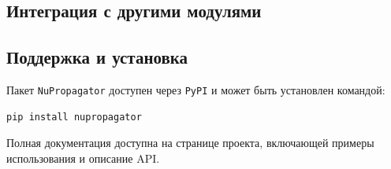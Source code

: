 \subsection{Интеграция с другими модулями}

\subsection{Поддержка и установка}

Пакет \texttt{NuPropagator} доступен через \texttt{PyPI} и может быть установлен командой:
\begin{verbatim}
pip install nupropagator
\end{verbatim}
Полная документация доступна на странице проекта, включающей примеры использования и описание API.
